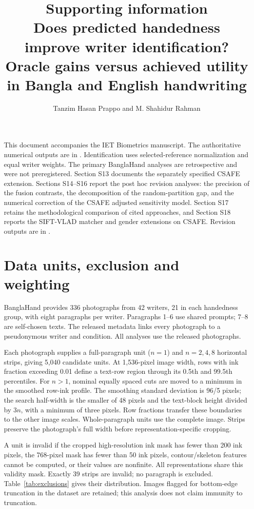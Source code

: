 \documentclass[10pt,a4paper]{article}
\title{Supporting information\\[4pt]\large Does predicted handedness improve writer identification? Oracle gains versus achieved utility in Bangla and English handwriting}
\author{Tanzim Hasan Prappo and M. Shahidur Rahman}
\date{}
\begin{document}
\maketitle
\vspace{-12pt}
This document accompanies the IET Biometrics manuscript. The authoritative numerical outputs are in . Identification uses selected-reference normalization and equal writer weights. The primary BanglaHand analyses are retrospective and were not preregistered. Section S13 documents the separately specified CSAFE extension. Sections S14--S16 report the post hoc revision analyses: the precision of the fusion contrasts, the decomposition of the random-partition gap, and the numerical correction of the CSAFE adjusted sensitivity model. Section S17 retains the methodological comparison of cited approaches, and Section S18 reports the SIFT-VLAD matcher and gender extensions on CSAFE. Revision outputs are in .

\section{Data units, exclusion and weighting}
BanglaHand provides 336 photographs from 42 writers, 21 in each handedness group, with eight paragraphs per writer. Paragraphs 1--6 use shared prompts; 7--8 are self-chosen texts. The released metadata links every photograph to a pseudonymous writer and condition. All analyses use the released photographs.

Each photograph supplies a full-paragraph unit ($n=1$) and $n=2,4,8$ horizontal strips, giving 5,040 candidate units. At 1,536-pixel image width, rows with ink fraction exceeding 0.01 define a text-row region through its 0.5th and 99.5th percentiles. For $n>1$, nominal equally spaced cuts are moved to a minimum in the smoothed row-ink profile. The smoothing standard deviation is 96/5 pixels; the search half-width is the smaller of 48 pixels and the text-block height divided by $3n$, with a minimum of three pixels. Row fractions transfer these boundaries to the other image scales. Whole-paragraph units use the complete image. Strips preserve the photograph's full width before representation-specific cropping.

A unit is invalid if the cropped high-resolution ink mask has fewer than 200 ink pixels, the 768-pixel mask has fewer than 50 ink pixels, contour/skeleton features cannot be computed, or their values are nonfinite. All representations share this validity mask. Exactly 39 strips are invalid; no paragraph is excluded. Table~\ref{tab:exclusions} gives their distribution. Images flagged for bottom-edge truncation in the dataset are retained; this analysis does not claim immunity to truncation.
\end{document}
